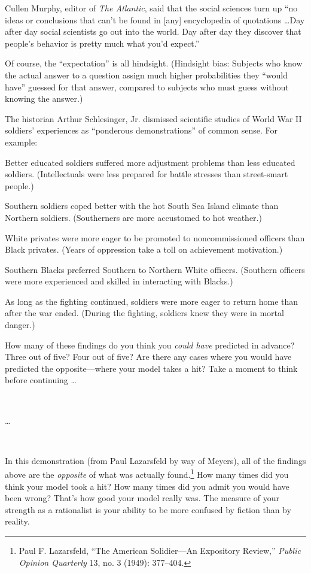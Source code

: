 {
 Cullen Murphy, editor of \textit{The Atlantic}, said that the
social sciences turn up ``no ideas or conclusions that
can't be found in [any] encyclopedia of quotations
\ldots Day after day social scientists go out into the world. Day after
day they discover that people's behavior is pretty much
what you'd expect.''}

{
 Of course, the ``expectation''
is all hindsight. (Hindsight bias: Subjects who know the actual answer
to a question assign much higher probabilities they
``would have'' guessed for that
answer, compared to subjects who must guess without knowing the
answer.)}

{
 The historian Arthur Schlesinger, Jr. dismissed scientific studies
of World War II soldiers' experiences as
``ponderous demonstrations'' of
common sense. For example:}

{
 Better educated soldiers suffered more adjustment problems than
less educated soldiers. (Intellectuals were less prepared for battle
stresses than street-smart people.)}

{
 Southern soldiers coped better with the hot South Sea Island
climate than Northern soldiers. (Southerners are more accustomed to hot
weather.)}

{
 White privates were more eager to be promoted to noncommissioned
officers than Black privates. (Years of oppression take a toll on
achievement motivation.)}

{
 Southern Blacks preferred Southern to Northern White officers.
(Southern officers were more experienced and skilled in interacting
with Blacks.)}

{
 As long as the fighting continued, soldiers were more eager to
return home than after the war ended. (During the fighting, soldiers
knew they were in mortal danger.)}

{
 How many of these findings do you think you \textit{could have}
predicted in advance? Three out of five? Four out of five? Are there
any cases where you would have predicted the opposite---where your
model takes a hit? Take a moment to think before continuing \ldots}

{
 ~}

{
 \ldots}

{
 ~}

{
 In this demonstration (from Paul Lazarsfeld by way of Meyers), all
of the findings above are the \textit{opposite} of what was actually
found.\footnote{Paul F. Lazarsfeld, ``The American
Solidier---An Expository Review,'' \textit{Public
Opinion Quarterly} 13, no. 3 (1949): 377--404.} How many times did you think your model took
a hit? How many times did you admit you would have been wrong?
That's how good your model really was. The measure of
your strength as a rationalist is your ability to be more confused by
fiction than by reality.}

